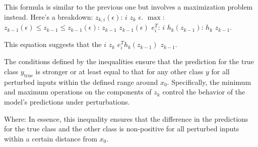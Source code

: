 This formula is similar to the previous one but involves a maximization problem instead. Here's a breakdown:
$z_{k,i}(\epsilon)$:  $i$  $z_k$  $\epsilon$.
$\max$: 
$z_{k-1}(\epsilon) \leq z_{k-1} \leq z_{k-1}(\epsilon)$:  $z_{k-1}$  $z_{k-1}(\epsilon)$ 
$e^T_i$:  $i$ 
$h_k(z_{k-1})$:  $h_k$  $z_{k-1}$.

This equation suggests that the $i$  $z_k$  $e^T_i h_k(z_{k-1})$  $z_{k-1}$.

The conditions defined by the inequalities ensure that the prediction for the true class $y_{\text{true}}$ is stronger or at least equal to that for any other class $y$ for all perturbed inputs within the defined range around $x_0$. Specifically, the minimum and maximum operations on the components of $z_k$ control the behavior of the model's predictions under perturbations.

Where:
In essence, this inequality ensures that the difference in the predictions for the true class and the other class is non-positive for all perturbed inputs within a certain distance from $x_0$.